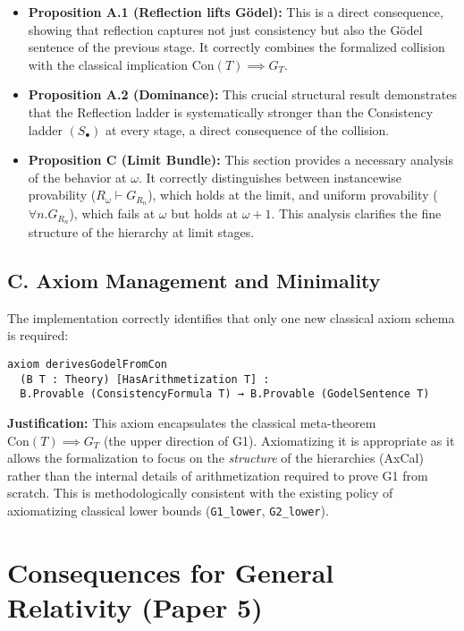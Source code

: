 \documentclass[11pt]{article}
\newcommand{\Con}{\mathrm{Con}}
\begin{document}
\begin{itemize}
\item \textbf{Proposition A.1 (Reflection lifts Gödel):} This is a direct consequence, showing that reflection captures not just consistency but also the Gödel sentence of the previous stage. It correctly combines the formalized collision with the classical implication $\Con(T) \implies G_T$.

\item \textbf{Proposition A.2 (Dominance):} This crucial structural result demonstrates that the Reflection ladder is systematically stronger than the Consistency ladder $(S_\bullet)$ at every stage, a direct consequence of the collision.

\item \textbf{Proposition C (Limit Bundle):} This section provides a necessary analysis of the behavior at $\omega$. It correctly distinguishes between instancewise provability ($R_\omega \vdash G_{R_n}$), which holds at the limit, and uniform provability ($\forall n. G_{R_n}$), which fails at $\omega$ but holds at $\omega+1$. This analysis clarifies the fine structure of the hierarchy at limit stages.
\end{itemize}

\subsection{C. Axiom Management and Minimality}

The implementation correctly identifies that only one new classical axiom schema is required:

\begin{lstlisting}[language=Lean]
axiom derivesGodelFromCon
  (B T : Theory) [HasArithmetization T] :
  B.Provable (ConsistencyFormula T) → B.Provable (GodelSentence T)
\end{lstlisting}

\textbf{Justification:} This axiom encapsulates the classical meta-theorem $\Con(T) \implies G_T$ (the upper direction of G1). Axiomatizing it is appropriate as it allows the formalization to focus on the \emph{structure} of the hierarchies (AxCal) rather than the internal details of arithmetization required to prove G1 from scratch. This is methodologically consistent with the existing policy of axiomatizing classical lower bounds (\texttt{G1\_lower}, \texttt{G2\_lower}).

\section{Consequences for General Relativity (Paper 5)}
\end{document}
